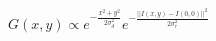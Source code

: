\documentclass{article}
\begin{document}
$G(x,y) \propto e^{- \frac {x^2+y^2}{2\sigma^2_d}}e^{- \frac{{||I(x,y)-I(0,0)||}^2}{2\sigma^2_r}}$
\end{document}
